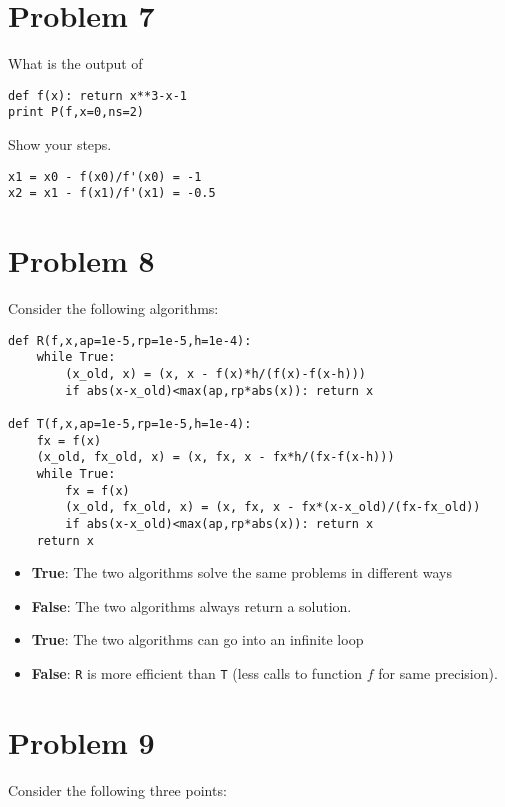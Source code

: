 \documentclass[12pt]{article}
\begin{document}
\newpage\section{Problem 7}

\noindent What is the output of

\begin{verbatim}
def f(x): return x**3-x-1
print P(f,x=0,ns=2)
\end{verbatim}
Show your steps.

\begin{verbatim}
x1 = x0 - f(x0)/f'(x0) = -1
x2 = x1 - f(x1)/f'(x1) = -0.5
\end{verbatim}

\newpage\section{Problem 8}

\noindent Consider the following algorithms:

\begin{verbatim}
def R(f,x,ap=1e-5,rp=1e-5,h=1e-4):
    while True:
        (x_old, x) = (x, x - f(x)*h/(f(x)-f(x-h)))
        if abs(x-x_old)<max(ap,rp*abs(x)): return x

def T(f,x,ap=1e-5,rp=1e-5,h=1e-4):
    fx = f(x)
    (x_old, fx_old, x) = (x, fx, x - fx*h/(fx-f(x-h)))
    while True:
        fx = f(x)
        (x_old, fx_old, x) = (x, fx, x - fx*(x-x_old)/(fx-fx_old))
        if abs(x-x_old)<max(ap,rp*abs(x)): return x
    return x
\end{verbatim}

\begin{itemize}
\item {\bf True}: The two algorithms solve the same problems in different ways
\item {\bf False}: The two algorithms always return a solution.
\item {\bf True}: The two algorithms can go into an infinite loop
\item {\bf False}: {\tt R} is more efficient than {\tt T} (less calls to function $f$ for same precision).
\end{itemize} 

\newpage\section{Problem 9}

\noindent Consider the following three points:
\end{document}
